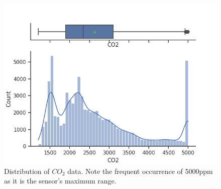 \documentclass[conference]{IEEEtran}
\begin{document}
\begin{figure}[htbp]
\begin{center}
\includegraphics[width=1\linewidth]{figs/CO2.png}
\caption{Distribution of $CO_2$ data. Note the frequent occurrence of 5000ppm as it is the sensor's maximum range.}
\label{fig:co2}
\end{center}
\end{figure}
\end{document}
